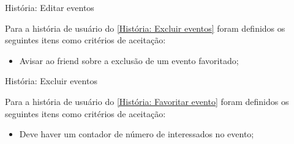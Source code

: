 \def\arraystretch{2}
\begin{quadro}[htb]
\centering
\ABNTEXfontereduzida
\caption[História: Editar eventos]{História: Editar eventos}
\label{História: Editar eventos}
\end{quadro}
\FloatBarrier 

Para a história de usuário do \autoref{História: Excluir eventos} foram definidos os seguintes itens como critérios de aceitação:

\begin{itemize}
\item Avisar ao \gls{friend} sobre a exclusão de um evento favoritado;
\end{itemize}

\def\arraystretch{2}
\begin{quadro}[htb]
\centering
\ABNTEXfontereduzida
\caption[História: Excluir eventos]{História: Excluir eventos}
\label{História: Excluir eventos}
\end{quadro}
\FloatBarrier 


Para a história de usuário do \autoref{História: Favoritar evento} foram definidos os seguintes itens como critérios de aceitação:

\begin{itemize}
\item  Deve haver um contador de número de interessados no evento;
\end{itemize}

